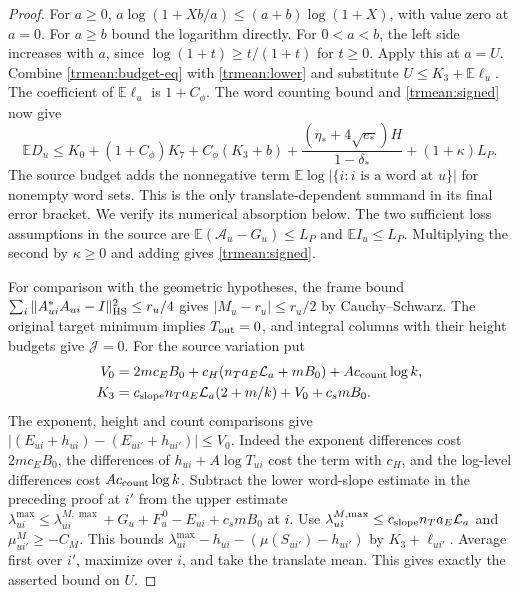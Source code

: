\begin{proof}
For \(a\ge0\), \(a\log(1+Xb/a)\le(a+b)\log(1+X)\), with value
zero at \(a=0\). For \(a\ge b\) bound the logarithm directly.
For \(0<a<b\), the left side increases with \(a\), since
\(\log(1+t)\ge t/(1+t)\) for \(t\ge0\). Apply this at \(a=U\).
Combine \eqref{trmean:budget-eq} with \eqref{trmean:lower} and
substitute \(U\le K_3+\mathbb E\ell_u\). The coefficient of
\(\mathbb E\ell_u\) is \(1+C_\phi\). The word counting bound and
\eqref{trmean:signed} now give
\[
 \mathbb E D_u\le K_0+(1+C_\phi)K_7+C_\phi(K_3+b)
           +\frac{(\eta_*+4\sqrt{e_*})H}{1-\delta_*}
           +(1+\kappa)L_P .
\]
The source budget adds the nonnegative term
\(\mathbb E\log|\{i:i\text{ is a word at }u\}|\) for nonempty word
sets. This is the only translate-dependent summand in its final error
bracket. We verify its numerical absorption below.
The two sufficient loss assumptions
in the source are \(\mathbb E(\mathcal A_u-G_u)\le L_P\) and
\(\mathbb E I_u\le L_P\). Multiplying the second by \(\kappa\ge0\)
and adding gives \eqref{trmean:signed}.

For comparison with the geometric hypotheses, the frame bound
\(\sum_i\|A_{ui}^*A_{ui}-I\|_{\rm HS}^2\le r_u/4\) gives
\(|M_u-r_u|\le r_u/2\) by Cauchy--Schwarz. The original target
minimum implies \(T_{\rm out}=0\), and integral columns with their
height budgets give \(\mathcal J=0\). For the source variation put
\[
\begin{aligned}
 V_0&=2mc_EB_0+c_H(n_Ta_E\mathcal L_a+mB_0)+Ac_{\rm count}\log k,\\
 K_3&=c_{\rm slope}n_Ta_E\mathcal L_a(2+m/k)+V_0+c_s mB_0 .
\end{aligned}
\]
The exponent, height and count comparisons give
\(|(E_{ui}+h_{ui})-(E_{ui'}+h_{ui'})|\le V_0\).
Indeed the exponent differences cost \(2mc_EB_0\), the differences
of \(h_{ui}+A\log T_{ui}\) cost the term with \(c_H\), and the
log-level differences cost \(Ac_{\rm count}\log k\).
Subtract the lower word-slope estimate in the preceding proof at
\(i'\) from the upper estimate
\(\lambda^{\max}_{ui}\le\lambda^{M,\max}_{ui}+G_u+F_u^{\,0}
-E_{ui}+c_smB_0\) at \(i\). Use
\(\lambda^{M,\max}_{ui}\le c_{\rm slope}n_Ta_E\mathcal L_a\)
and \(\mu^M_{ui'}\ge-C_M\).
This bounds \(\lambda^{\max}_{ui}-h_{ui}-
(\mu(S_{ui'})-h_{ui'})\) by \(K_3+\ell_{ui'}\).
Average first over \(i'\), maximize over \(i\), and take the
translate mean. This gives exactly the asserted bound on \(U\).


\end{proof}
